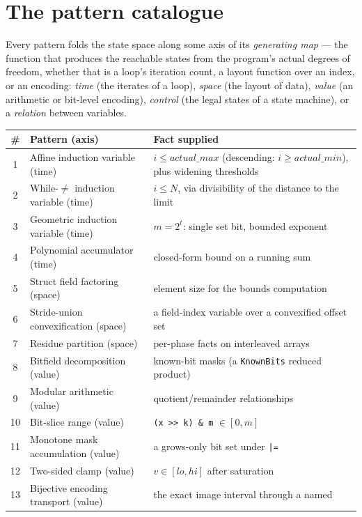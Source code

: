 \documentclass[11pt,a4paper]{article}
\begin{document}
\section{The pattern catalogue}
\label{sec:patterns}

Every pattern folds the state space along some axis of its \emph{generating map} ---
the function that produces the reachable states from the program's actual degrees of
freedom, whether that is a loop's iteration count, a layout function over an index, or an
encoding: \emph{time}
(the iterates of a loop), \emph{space} (the layout of data), \emph{value} (an arithmetic
or bit-level encoding), \emph{control} (the legal states of a state machine), or a
\emph{relation} between variables.

\begin{center}
\begin{tabular}{clp{7.0cm}}
\toprule
\# & Pattern (axis) & Fact supplied \\
\midrule
1 & Affine induction variable (time) & $i \le \mathit{actual\_max}$ (descending:
    $i \ge \mathit{actual\_min}$), plus widening thresholds \\
2 & While-$\ne$ induction variable (time) & $i \le N$, via divisibility of the distance
    to the limit \\
3 & Geometric induction variable (time) & $m = 2^t$: single set bit, bounded exponent \\
4 & Polynomial accumulator (time) & closed-form bound on a running sum \\
\midrule
5 & Struct field factoring (space) & element size for the bounds computation \\
6 & Stride-union convexification (space) & a field-index variable over a convexified
    offset set \\
7 & Residue partition (space) & per-phase facts on interleaved arrays \\
\midrule
8 & Bitfield decomposition (value) & known-bit masks (a \texttt{KnownBits} reduced
    product) \\
9 & Modular arithmetic (value) & quotient/remainder relationships \\
10 & Bit-slice range (value) & \texttt{(x >> k) \& m} $\in [0, m]$ \\
11 & Monotone mask accumulation (value) & a grows-only bit set under \texttt{|=} \\
12 & Two-sided clamp (value) & $v \in [\mathit{lo}, \mathit{hi}]$ after saturation \\
13 & Bijective encoding transport (value) & the exact image interval through a named

\end{tabular}
\end{center}
\end{document}
